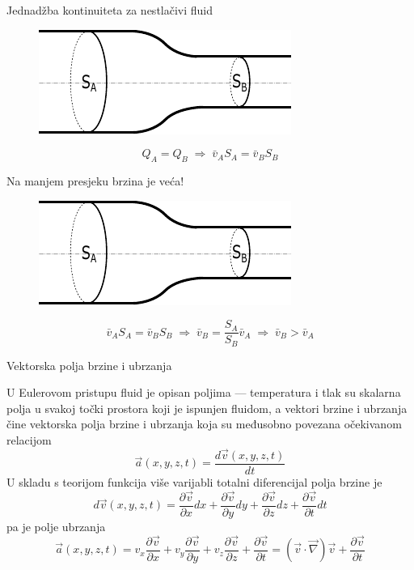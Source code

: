 \documentclass[croatian]{beamer}
\begin{document}
\begin{frame}{Jednadžba kontinuiteta za nestlačivi fluid}

\begin{figure}
\includegraphics[scale=1.35]{slike/jdba-kont-cijev}
\end{figure}
\[
Q_{A}=Q_{B}\;\Rightarrow\;\bar{v}_{A}S_{A}=\bar{v}_{B}S_{B}
\]
\end{frame}

\begin{frame}{Na manjem presjeku brzina je veća!}

\begin{figure}
\includegraphics[scale=1.35]{slike/jdba-kont-cijev}
\end{figure}
 \[
\bar{v}_{A}S_{A}=\bar{v}_{B}S_{B}\;\Rightarrow\;\bar{v}_{B}=\frac{S_{A}}{S_{B}}\bar{v}_{A}\;\Rightarrow\;\bar{v}_{B}>\bar{v}_{A}
\]
\end{frame}

\begin{frame}{Vektorska polja brzine i ubrzanja}

U Eulerovom pristupu fluid je opisan poljima --- temperatura i tlak
su skalarna polja u svakoj točki prostora koji je ispunjen fluidom,
a vektori brzine i ubrzanja čine vektorska polja brzine i ubrzanja
koja su međusobno povezana očekivanom relacijom
\[
\vec{a}(x,y,z,t)=\frac{d\vec{v}(x,y,z,t)}{dt}
\]
U skladu s teorijom funkcija više varijabli totalni diferencijal polja
brzine je
\[
d\vec{v}(x,y,z,t)=\frac{\partial\vec{v}}{\partial x}dx+\frac{\partial\vec{v}}{\partial y}dy+\frac{\partial\vec{v}}{\partial z}dz+\frac{\partial\vec{v}}{\partial t}dt
\]
pa je polje ubrzanja
\[
\vec{a}(x,y,z,t)=v_{x}\frac{\partial\vec{v}}{\partial x}+v_{y}\frac{\partial\vec{v}}{\partial y}+v_{z}\frac{\partial\vec{v}}{\partial z}+\frac{\partial\vec{v}}{\partial t}=(\vec{v}\cdot\vec{\nabla})\vec{v}+\frac{\partial\vec{v}}{\partial t}
\]
\end{frame}
\end{document}
